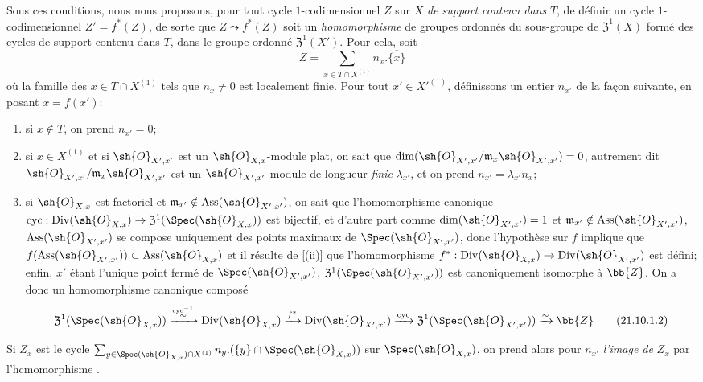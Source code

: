 \begin{env}[21.10.1]
Sous ces conditions, nous nous proposons, pour tout cycle $1$-codimensionnel $Z$ sur $X$ \emph{de support contenu dans} $T$, de définir un cycle $1$-codimensionnel $Z'=f^*(Z)$, de sorte
que $Z\leadsto f^*(Z)$ soit un \emph{homomorphisme} de groupes ordonnés du sous-groupe de $\mathfrak{Z}^1(X)$ formé des cycles de support contenu dans $T$, dans le groupe ordonné $\mathfrak{Z}^1(X')$.
Pour cela, soit
\[
\label{IV.21.10.1.1}
  Z=\sum_{x\in T\cap X^{(1)}}n_x.\overline{\{x\}}
  \tag{21.10.1.1}
\]
où la famille des $x\in T\cap X^{(1)}$ tels que $n_x\neq0$ est localement finie.
Pour tout $x'\in X'^{(1)}$, définissons un entier $n_{x'}$ de la façon suivante, en posant $x=f(x')$:
\begin{enumerate}[label=\arabic*\textsuperscript{o}]
  \item si $x\notin T$, on prend $n_{x'}=0$;
  \item si $x\in X^{(1)}$ et si $\sh{O}_{X',x'}$ est un $\sh{O}_{X,x}$-module plat, on sait  que $\dim(\sh{O}_{X',x'}/\mathfrak{m}_x\sh{O}_{X',x'})=0$, autrement dit $\sh{O}_{X',x'}/\mathfrak{m}_x\sh{O}_{X',x'}$ est un $\sh{O}_{X',x'}$-module de longueur \emph{finie} $\lambda_{x'}$, et on prend $n_{x'}=\lambda_{x'}n_x$;
  \item si $\sh{O}_{X,x}$ est factoriel et $\mathfrak{m}_{x'}\notin\operatorname{Ass}(\sh{O}_{X',x'})$, on sait  que l'homomorphisme canonique $\operatorname{cyc}:\operatorname{Div}(\sh{O}_{X,x})\to\mathfrak{Z}^1(\Spec(\sh{O}_{X,x}))$ est bijectif, et d'autre part comme $\dim(\sh{O}_{X',x'})=1$ et $\mathfrak{m}_{x'}\notin\operatorname{Ass}(\sh{O}_{X',x'})$, $\operatorname{Ass}(\sh{O}_{X',x'})$ se compose uniquement des points maximaux de $\Spec(\sh{O}_{X',x'})$, donc l'hypothèse sur $f$ implique que $f(\operatorname{Ass}(\sh{O}_{X',x'}))\subset\operatorname{Ass}(\sh{O}_{X,x})$ et il résulte de [(ii)] que l'homomorphisme $f^*:\operatorname{Div}(\sh{O}_{X,x})\to\operatorname{Div}(\sh{O}_{X',x'})$ est défini;
enfin, $x'$ étant l'unique point fermé de $\Spec(\sh{O}_{X',x'})$, $\mathfrak{Z}^1(\Spec(\sh{O}_{X',x'}))$ est canoniquement isomorphe à $\bb{Z}$.
On a donc un homomorphisme canonique composé
\[
\label{IV.21.10.1.2}
  \mathfrak{Z}^1(\Spec(\sh{O}_{X,x}))
  \xrightarrow{\overset{\operatorname{cyc}^{-1}}{\sim}}\operatorname{Div}(\sh{O}_{X,x})
  \xrightarrow{f^*}\operatorname{Div}(\sh{O}_{X',x'})
  \xrightarrow{\operatorname{cyc}}\mathfrak{Z}^1(\Spec(\sh{O}_{X',x'}))
  \xrightarrow{\sim}\bb{Z}
  \tag{21.10.1.2}
\]
\end{enumerate}

Si $Z_x$ est le cycle $\sum_{y\in\Spec(\sh{O}_{X,x})\cap X^{(1)}}n_y.(\overline{\{y\}}\cap\Spec(\sh{O}_{X,x}))$ sur $\Spec(\sh{O}_{X,x})$, on prend alors pour $n_{x'}$ \emph{l'image de} $Z_x$ par l'hcmomorphisme .
\end{env}

